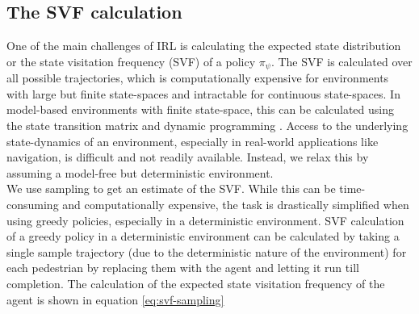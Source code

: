 \subsection{The SVF calculation}
One of the main challenges of IRL is calculating the expected state distribution or the state visitation frequency (SVF) of a policy $\pi_{\psi}$. The SVF is calculated over all possible trajectories, which is computationally expensive for environments with large but finite state-spaces and intractable for continuous state-spaces. In model-based environments with finite state-space, this can be calculated using the state transition matrix and dynamic programming \cite{wulfmeier2015maximum}. Access to the underlying state-dynamics of an environment, especially in real-world applications like navigation, is difficult and not readily available. Instead, we relax this by assuming a model-free but deterministic environment.\\

We use sampling to get an estimate of the SVF. While this can be time-consuming and computationally expensive, the task is drastically simplified when using greedy policies, especially in a deterministic environment. SVF calculation of a greedy policy in a deterministic environment can be calculated by taking a single sample trajectory (due to the deterministic nature of the environment) for each pedestrian by replacing them with the agent and letting it run till completion. The calculation of the expected state visitation frequency of the agent is shown in equation \autoref{eq:svf-sampling}

